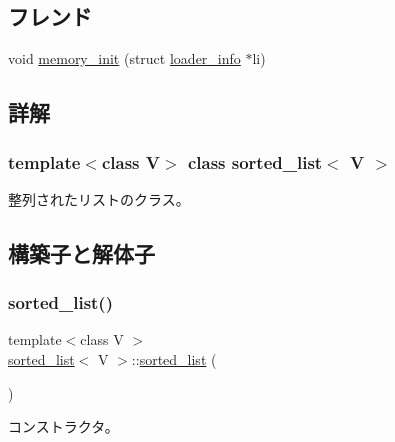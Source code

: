 \subsection*{フレンド}
\begin{DoxyCompactItemize}
\item 
void \hyperlink{classsorted__list_a8840f01b46a3b9c43a461591a579c1bd}{memory\+\_\+init} (struct \hyperlink{structloader__info}{loader\+\_\+info} $\ast$li)
\end{DoxyCompactItemize}


\subsection{詳解}
\subsubsection*{template$<$class V$>$\newline
class sorted\+\_\+list$<$ V $>$}

整列されたリストのクラス。 

\subsection{構築子と解体子}
\hypertarget{classsorted__list_a615f6cbdcb90d6da6894c47e4ae02dfe}{}\label{classsorted__list_a615f6cbdcb90d6da6894c47e4ae02dfe} 
\subsubsection{\texorpdfstring{sorted\+\_\+list()}{sorted\_list()}\hspace{0.1cm}{\footnotesize\ttfamily [1/3]}}
{\footnotesize\ttfamily template$<$class V $>$ \\
\hyperlink{classsorted__list}{sorted\+\_\+list}$<$ V $>$\+::\hyperlink{classsorted__list}{sorted\+\_\+list} (\begin{DoxyParamCaption}{ }\end{DoxyParamCaption})}

コンストラクタ。 \hypertarget{classsorted__list_a8e3259e7d55bcbccffad17f9e5c7a241}{}\label{classsorted__list_a8e3259e7d55bcbccffad17f9e5c7a241} 
